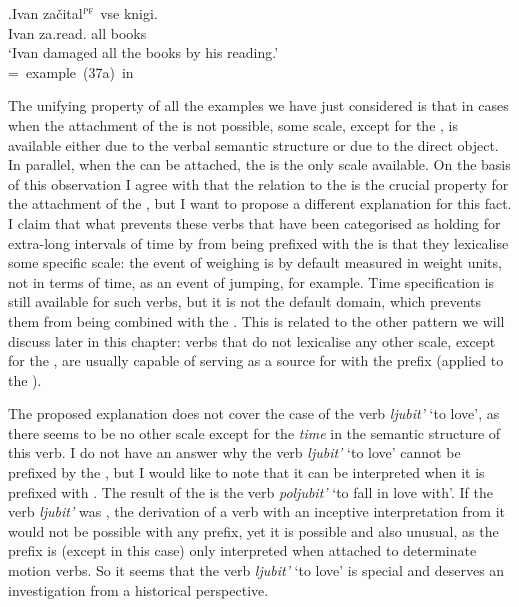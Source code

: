\exg.\label{ex:zachital}Ivan za\v{c}ital$^{\textsc{pf}}$ vse knigi.\\
Ivan za.read. all books\\
`Ivan damaged all the books by his reading.'\\\hbox{}\hfill\hbox{= example (37a) in \citealt[246]{Braginsky:08}}

The unifying property of all the examples we have just considered is that in cases when the attachment of the   is not possible, some scale, except for the , is available either due to the verbal semantic structure or due to the direct object. In parallel, when the   can be attached, the  is the only scale available. On the basis of this observation I agree with \citet{Paducheva:96} that the relation to the  is the crucial property for the attachment of the  , but I want to propose a different explanation for this fact. I claim that what prevents these verbs that have been categorised as holding for extra-long intervals of time by \citet{Paducheva:96} from being prefixed with the   is that they lexicalise some specific scale: the event of weighing is by default measured in weight units, not in terms of time, as an event of jumping, for example. Time specification is still available for such verbs, but it is not the default domain, which prevents them from being combined with the  . This is related to the other pattern we will discuss later in this chapter: verbs that do not lexicalise any other scale, except for the , are usually capable of serving as a source for  with the  prefix  (applied to the ). 

The proposed explanation does not cover the case of the verb \textit{ljubit'} `to love', as there seems to be no other scale except for the \textit{time} in the semantic structure of this verb. I do not have an answer why the verb \textit{ljubit'} `to love' cannot be prefixed by the  , but I would like to note that it can be interpreted  when it is prefixed with . The result of the  is the verb \textit{poljubit'} `to fall in love with'. If the verb \textit{ljubit'} was , the derivation of a verb with an inceptive interpretation from it would not be possible with any prefix, yet it is possible and also unusual, as the prefix  is (except in this case) only interpreted  when attached to determinate motion verbs. So it seems that the verb \textit{ljubit'} `to love' is special and deserves an investigation from a historical perspective. 

